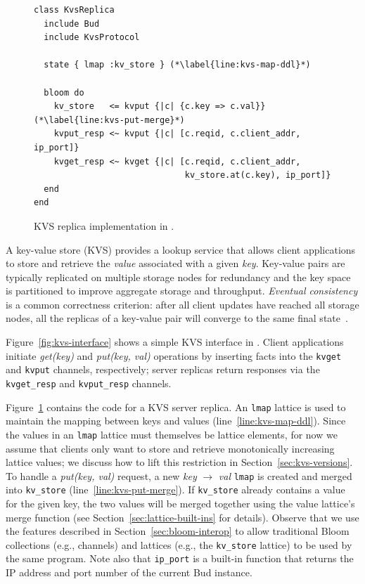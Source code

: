 \begin{figure}[t]
\begin{scriptsize}
\begin{lstlisting}
class KvsReplica
  include Bud
  include KvsProtocol

  state { lmap :kv_store } (*\label{line:kvs-map-ddl}*)

  bloom do
    kv_store   <= kvput {|c| {c.key => c.val}} (*\label{line:kvs-put-merge}*)
    kvput_resp <~ kvput {|c| [c.reqid, c.client_addr, ip_port]}
    kvget_resp <~ kvget {|c| [c.reqid, c.client_addr,
                              kv_store.at(c.key), ip_port]}
  end
end
\end{lstlisting}
\end{scriptsize}
\caption{KVS replica implementation in \lang.}
\label{fig:kvs-replica}
\end{figure}

A key-value store (KVS) provides a lookup service that allows client
applications to store and retrieve the \emph{value} associated with a given
\emph{key}. Key-value pairs are typically replicated on multiple storage nodes
for redundancy and the key space is partitioned to improve aggregate storage and
throughput. \emph{Eventual consistency} is a common correctness criterion: after
all client updates have reached all storage nodes, all the replicas of a
key-value pair will converge to the same final state~\cite{Terry1995,vogels}.

Figure~\ref{fig:kvs-interface} shows a simple KVS interface in \lang. Client
applications initiate \emph{get(key)} and \emph{put(key, val)} operations by
inserting facts into the \texttt{kvget} and \texttt{kvput} channels,
respectively; server replicas return responses via the \texttt{kvget\_resp} and
\texttt{kvput\_resp} channels.

Figure~\ref{fig:kvs-replica} contains the \lang code for a KVS server
replica. An \texttt{lmap} lattice is used to maintain the mapping between keys
and values (line~\ref{line:kvs-map-ddl}). Since the values in an \texttt{lmap}
lattice must themselves be lattice elements, for now we assume that clients only
want to store and retrieve monotonically increasing lattice values; we discuss
how to lift this restriction in Section~\ref{sec:kvs-versions}. To handle a
\emph{put(key, val)} request, a new \emph{key} $\to$ \emph{val} \texttt{lmap} is
created and merged into \texttt{kv\_store} (line~\ref{line:kvs-put-merge}). If
\texttt{kv\_store} already contains a value for the given key, the two values
will be merged together using the value lattice's merge function (see
Section~\ref{sec:lattice-built-ins} for details). Observe that we use the \lang
features described in Section~\ref{sec:bloom-interop} to allow traditional Bloom
collections (e.g., channels) and lattices (e.g., the \texttt{kv\_store} lattice)
to be used by the same program. Note also that \texttt{ip\_port} is a built-in
function that returns the IP address and port number of the current Bud
instance.

